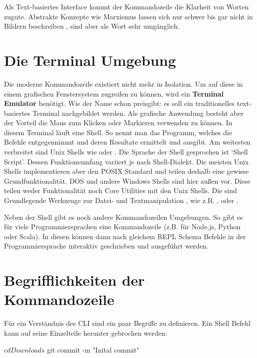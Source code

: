 \documentclass[oneside,bibliography=totocnumbered,BCOR=5mm]{scrbook}
\newenvironment{code}{\captionsetup{type=listing, skip=0pt}}{}
\begin{document}
Als Text-basiertes Interface kommt der Kommandozeile die Klarheit von Worten
zugute. Abstrakte Konzepte wie Marxismus lassen sich nur schwer bis gar nicht in
Bildern beschreiben \parencite{Raskin_2008}, sind aber als Wort sehr umgänglich.

\section{Die Terminal Umgebung}
\label{sec:term_umgegebung}

Die moderne Kommandozeile existiert nicht mehr in Isolation. Um auf diese in
einem grafischen Fenstersystem zugreifen zu können, wird ein \textbf{Terminal
Emulator} benötigt. Wie der Name schon preisgibt: es soll ein traditionelles
text-basiertes Terminal nachgebildet werden. Als grafische Anwendung besteht
aber der Vorteil die Maus zum Klicken oder Markieren verwenden zu können. In
diesem Terminal läuft eine Shell. So nennt man das Programm, welches die Befehle
entgegennimmt und deren Resultate ermittelt und ausgibt. Am weitesten verbreitet
sind Unix Shells wie  oder .
Die Sprache der Shell gesprochen ist `Shell Script'. Dessen Funktionsumfang
variiert je nach Shell-Dialekt. Die meisten Unix Shells implementieren aber den
POSIX Standard und teilen deshalb eine gewisse Grundfunktionalität. DOS und
andere Windows Shells sind hier außen vor. Diese teilen weder Funktionalität
noch Core Utilities mit den Unix Shells. Die  sind
Grundlegende Werkzeuge zur Datei- und Textmanipulation \parencite{coreutils},
wie z.B. ,  oder .

Neben der Shell gibt es noch andere Kommandozeilen Umgebungen. So gibt es
für viele Programmiersprachen eine Kommandozeile (z.B. für Node.js, Python
oder Scala). In diesen können dann nach gleichem REPL Schema Befehle in der
Programmiersprache interaktiv geschrieben und ausgeführt werden.

\section{Begrifflichkeiten der Kommandozeile}
\label{sec:begriffe}

Für ein Verständnis des CLI sind ein paar Begriffe zu definieren. Ein Shell
Befehl kann auf seine Einzelteile herunter gebrochen werden:

\begin{code}
  \begin{shellcode}
$ cd Downloads
$ git commit -m "Inital commit"
  \end{shellcode}
\end{code}
\end{document}
